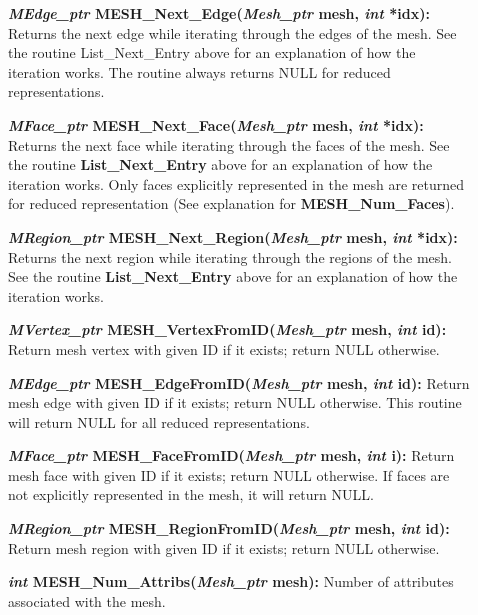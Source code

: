 \documentclass[12pt]{article}
\begin{document}
\begin{description}
\item[]{\bf {\em MEdge\_ptr} MESH\_Next\_Edge({\em Mesh\_ptr} mesh,
{\em int} *idx):} Returns the next edge while iterating through the
edges of the mesh. See the routine List\_Next\_Entry above for an
explanation of how the iteration works.  The routine always returns
NULL for reduced representations.

\item[]{\bf {\em MFace\_ptr} MESH\_Next\_Face({\em Mesh\_ptr} mesh,
{\em int} *idx):} Returns the next face while iterating through the
faces of the mesh. See the routine {\bf List\_Next\_Entry} above for
an explanation of how the iteration works.  Only faces explicitly
represented in the mesh are returned for reduced representation (See
explanation for {\bf MESH\_Num\_Faces}).

\item[]{\bf {\em MRegion\_ptr}
    MESH\_Next\_Region({\em Mesh\_ptr} mesh, {\em int} *idx):}
  Returns the next region while iterating through the regions of the
  mesh. See the routine {\bf List\_Next\_Entry} above for an
  explanation of how the iteration works.
  
\item[]

\item[]{\bf {\em MVertex\_ptr}
    MESH\_VertexFromID({\em Mesh\_ptr} mesh, {\em int} id):}
  Return mesh vertex with given ID if it exists; return NULL
  otherwise.
  
\item[]{\bf {\em MEdge\_ptr} MESH\_EdgeFromID({\em Mesh\_ptr}
    mesh, {\em int} id):} Return mesh edge with given ID if it
  exists; return NULL otherwise. This routine will return NULL for all
  reduced representations.

\item[]{\bf {\em MFace\_ptr} MESH\_FaceFromID({\em Mesh\_ptr}
    mesh, {\em int} i):} Return mesh face with given ID if it
  exists; return NULL otherwise. If faces are not explicitly
  represented in the mesh, it will return NULL.


\item[]{\bf {\em MRegion\_ptr}
    MESH\_RegionFromID({\em Mesh\_ptr} mesh, {\em int} id):}
  Return mesh region with given ID if it exists; return NULL
  otherwise.

\item[]

\item[]{\bf {\em int} MESH\_Num\_Attribs({\em Mesh\_ptr}
    mesh):} Number of attributes associated with the mesh.
  

\end{description}
\end{document}
